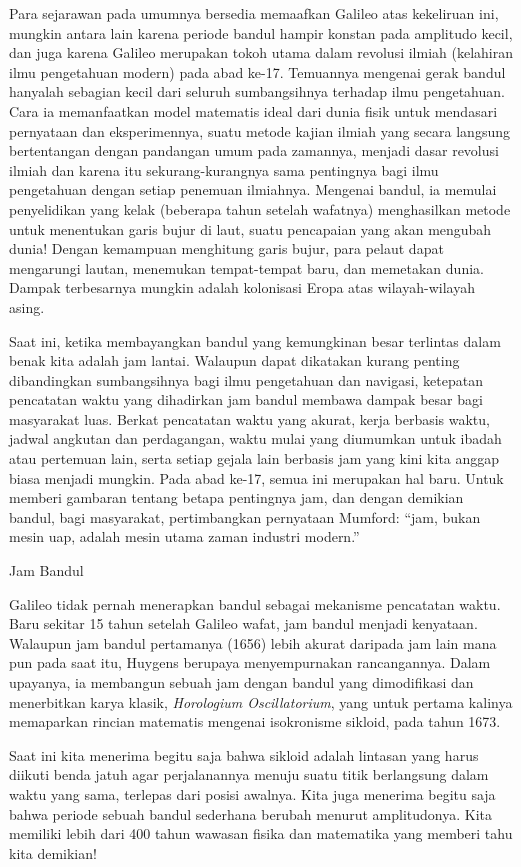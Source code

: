 Para sejarawan pada umumnya bersedia memaafkan Galileo atas kekeliruan
ini, mungkin antara lain karena periode bandul hampir konstan pada
amplitudo kecil, dan juga karena Galileo merupakan
tokoh utama dalam revolusi ilmiah (kelahiran ilmu pengetahuan modern)
pada abad ke-17. Temuannya mengenai gerak bandul hanyalah sebagian
kecil dari seluruh sumbangsihnya terhadap ilmu pengetahuan. Cara ia
memanfaatkan model matematis ideal dari dunia fisik untuk mendasari
pernyataan dan eksperimennya, suatu metode kajian ilmiah yang secara
langsung bertentangan dengan pandangan umum pada zamannya, menjadi
dasar revolusi ilmiah dan karena itu sekurang-kurangnya sama pentingnya
bagi ilmu pengetahuan dengan setiap penemuan ilmiahnya. Mengenai bandul,
ia memulai penyelidikan yang kelak (beberapa tahun setelah wafatnya)
menghasilkan metode untuk menentukan garis bujur di laut, suatu pencapaian
yang akan mengubah dunia! Dengan kemampuan menghitung garis bujur,
para pelaut dapat mengarungi lautan, menemukan tempat-tempat baru,
dan memetakan dunia. Dampak terbesarnya mungkin adalah kolonisasi
Eropa atas wilayah-wilayah asing.

Saat ini, ketika membayangkan bandul yang kemungkinan
besar terlintas dalam benak kita adalah jam lantai. Walaupun dapat
dikatakan kurang penting dibandingkan sumbangsihnya bagi ilmu pengetahuan
dan navigasi, ketepatan pencatatan waktu yang dihadirkan jam bandul
membawa dampak besar bagi masyarakat luas. Berkat pencatatan waktu
yang akurat, kerja berbasis waktu, jadwal angkutan dan perdagangan,
waktu mulai yang diumumkan untuk ibadah atau pertemuan lain, serta
setiap gejala lain berbasis jam yang kini kita anggap biasa menjadi
mungkin. Pada abad ke-17, semua ini merupakan hal baru. Untuk memberi
gambaran tentang betapa pentingnya jam, dan dengan demikian bandul,
bagi masyarakat, pertimbangkan pernyataan Mumford: ``jam, bukan mesin
uap, adalah mesin utama zaman industri modern.''\cite{mumford} 

\noindent\begin{digression}{Jam Bandul}

\noindent Galileo tidak pernah menerapkan bandul
sebagai mekanisme pencatatan waktu. Baru sekitar 15 tahun setelah
Galileo wafat, jam bandul menjadi kenyataan. Walaupun jam bandul pertamanya
(1656) lebih akurat daripada jam lain mana pun pada saat itu, Huygens
berupaya menyempurnakan rancangannya. Dalam upayanya, ia membangun
sebuah jam dengan bandul yang dimodifikasi dan menerbitkan karya klasik,
\textit{Horologium Oscillatorium}, yang untuk pertama kalinya memaparkan
rincian matematis mengenai isokronisme sikloid, pada tahun 1673.\cite{scienceuk,tsbts} 

Saat ini kita menerima begitu saja bahwa sikloid adalah lintasan yang
harus diikuti benda jatuh agar perjalanannya menuju suatu titik berlangsung
dalam waktu yang sama, terlepas dari posisi awalnya. Kita juga menerima
begitu saja bahwa periode sebuah bandul sederhana berubah menurut
amplitudonya. Kita memiliki lebih dari 400 tahun wawasan fisika dan
matematika yang memberi tahu kita demikian! 

\noindent\end{digression}

